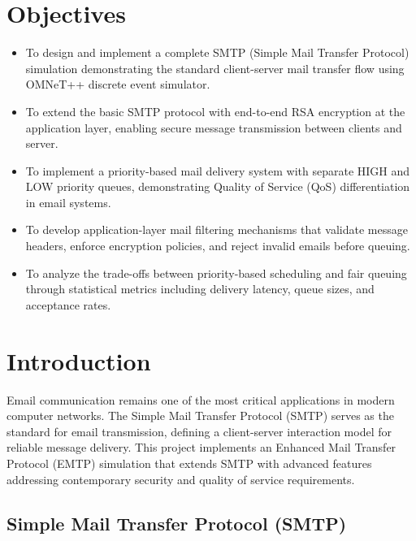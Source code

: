 \documentclass[12pt]{article}
\begin{document}
	\tableofcontents
	\newpage
	\listoffigures
	\newpage
	\listoftables
	\newpage
	
	\section*{Objectives}
	
	\begin{itemize}
		\item To design and implement a complete SMTP (Simple Mail Transfer Protocol) simulation demonstrating the standard client-server mail transfer flow using OMNeT++ discrete event simulator.
		\item To extend the basic SMTP protocol with end-to-end RSA encryption at the application layer, enabling secure message transmission between clients and server.
		\item To implement a priority-based mail delivery system with separate HIGH and LOW priority queues, demonstrating Quality of Service (QoS) differentiation in email systems.
		\item To develop application-layer mail filtering mechanisms that validate message headers, enforce encryption policies, and reject invalid emails before queuing.
		\item To analyze the trade-offs between priority-based scheduling and fair queuing through statistical metrics including delivery latency, queue sizes, and acceptance rates.
	\end{itemize}
	
	\section{Introduction}
	
	Email communication remains one of the most critical applications in modern computer networks. The Simple Mail Transfer Protocol (SMTP) serves as the standard for email transmission, defining a client-server interaction model for reliable message delivery. This project implements an Enhanced Mail Transfer Protocol (EMTP) simulation that extends SMTP with advanced features addressing contemporary security and quality of service requirements.
	
	\subsection{Simple Mail Transfer Protocol (SMTP)}
	
\end{document}
